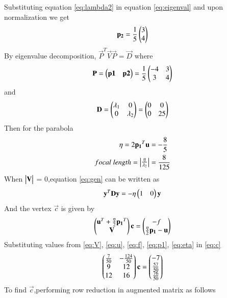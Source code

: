 \documentclass[journal,12pt,twocolumn]{IEEEtran}
\begin{document}
Substituting equation \eqref{eq:lambda2} in equation \eqref{eq:eigenval} and upon normalization we get
\begin{align}
    \mathbf{p_2} = \frac{1}{5}\begin{pmatrix}3\\4\end{pmatrix}
\end{align}
By eigenvalue decomposition, $\vec{P}^T\vec{V}\vec{P}=\vec{D}$
where
\begin{align}
    \mathbf{P} = \begin{pmatrix}\mathbf{p1}&\mathbf{p2}\end{pmatrix}=\frac{1}{5}\begin{pmatrix}-4&3\\3&4\end{pmatrix}
\end{align}
and
\begin{align}
    \mathbf{D} = \begin{pmatrix}\lambda_1&0\\0&\lambda_2\end{pmatrix} = \begin{pmatrix}0&0\\0&25\end{pmatrix}
\end{align}
Then for the parabola
\begin{align}
    \eta = 2\mathbf{p_1}^T\mathbf{u}&=-\frac{8}{5}\label{eq:eta}\\
    focal\;length =\begin{vmatrix}\frac{\eta}{\lambda_2}\end{vmatrix}&=\frac{8}{125}
\end{align}
When $\begin{vmatrix}\mathbf{V}\end{vmatrix}$ = 0,equation \eqref{eq:gen} can be written as
\begin{align}
    \mathbf{y}^T\mathbf{D}\mathbf{y}=-\eta\begin{pmatrix}1&0\end{pmatrix}\mathbf{y}
\end{align}
And the vertex $\vec{c}$ is given by
\begin{align}
    \begin{pmatrix}\mathbf{u}^T+\frac{\eta}{2}\mathbf{p_1}^T\\\mathbf{V}\end{pmatrix}\mathbf{c}=\begin{pmatrix}-f\\\frac{\eta}{2}\mathbf{p_1}-\mathbf{u}\end{pmatrix}\label{eq:c}
\end{align}
Substituting values from \eqref{eq:V}, \eqref{eq:u}, \eqref{eq:f}, \eqref{eq:p1}, \eqref{eq:eta} in \eqref{eq:c}
\begin{align}
    \begin{pmatrix}\frac{7}{50}&-\frac{124}{50}\\9&12\\12&16\end{pmatrix}\mathbf{c}=\begin{pmatrix}-7\\\frac{57}{50}\\\frac{76}{50}\end{pmatrix}
\end{align}
To find $\vec{c}$,performing row reduction in augmented matrix as follows
\end{document}

